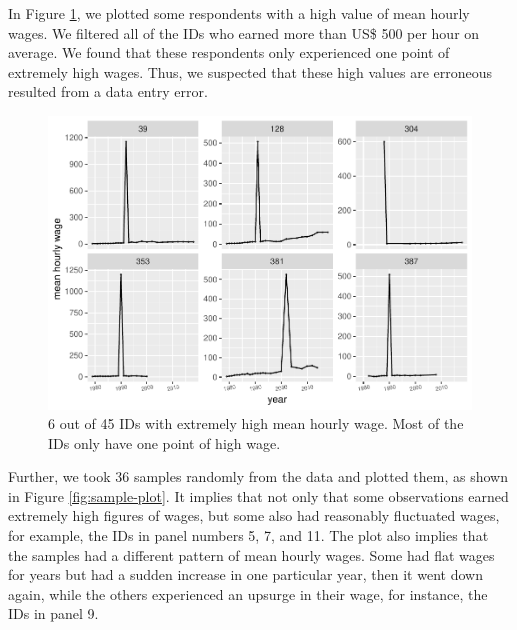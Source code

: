 \documentclass{article}
\begin{document}
In Figure \ref{fig:high-wages}, we plotted some respondents with a high value of mean hourly wages. We filtered all of the IDs who earned more than US\$ 500 per hour on average. We found that these respondents only experienced one point of extremely high wages. Thus, we suspected that these high values are erroneous resulted from a data entry error.

\begin{figure}
\centering
\includegraphics{figures/high-wages-1.pdf}
\caption{\label{fig:high-wages}6 out of 45 IDs with extremely high mean hourly wage. Most of the IDs only have one point of high wage.}
\end{figure}

Further, we took 36 samples randomly from the data and plotted them, as shown in Figure \ref{fig:sample-plot}. It implies that not only that some observations earned extremely high figures of wages, but some also had reasonably fluctuated wages, for example, the IDs in panel numbers 5, 7, and 11. The plot also implies that the samples had a different pattern of mean hourly wages. Some had flat wages for years but had a sudden increase in one particular year, then it went down again, while the others experienced an upsurge in their wage, for instance, the IDs in panel 9.
\end{document}
